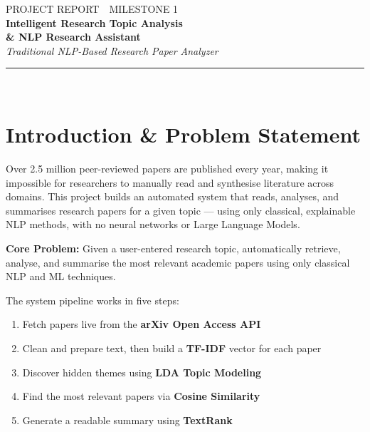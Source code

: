 \documentclass[11pt,a4paper]{article}
\begin{document}
\setlength{\parskip}{4pt}

\begin{center}
  \vspace*{1.8cm}
  {\small\color{blue}\MakeUppercase{Project Report~\textbullet~Milestone 1}}\\[0.5cm]
  {\LARGE\bfseries\color{navy}Intelligent Research Topic Analysis}\\[0.25cm]
  {\LARGE\bfseries\color{navy}\& NLP Research Assistant}\\[0.4cm]
  {\normalsize\color{muted}\itshape Traditional NLP-Based Research Paper Analyzer}\\[0.7cm]
  \textcolor{blue}{\rule{7.8cm}{1.2pt}}\\[1.0cm]
\end{center}

\section{Introduction \& Problem Statement}

Over 2.5 million peer-reviewed papers are published every year, making it impossible for researchers to manually read and synthesise literature across domains. This project builds an automated system that reads, analyses, and summarises research papers for a given topic --- using only classical, explainable NLP methods, with no neural networks or Large Language Models.

\begin{infobox}
\textbf{Core Problem:} Given a user-entered research topic, automatically retrieve, analyse, and summarise the most relevant academic papers using only classical NLP and ML techniques.
\end{infobox}

The system pipeline works in five steps:
\begin{enumerate}[leftmargin=1.8em,itemsep=1pt]
  \item Fetch papers live from the \textbf{arXiv Open Access API}
  \item Clean and prepare text, then build a \textbf{TF-IDF} vector for each paper
  \item Discover hidden themes using \textbf{LDA Topic Modeling}
  \item Find the most relevant papers via \textbf{Cosine Similarity}
  \item Generate a readable summary using \textbf{TextRank}
\end{enumerate}
\end{document}
